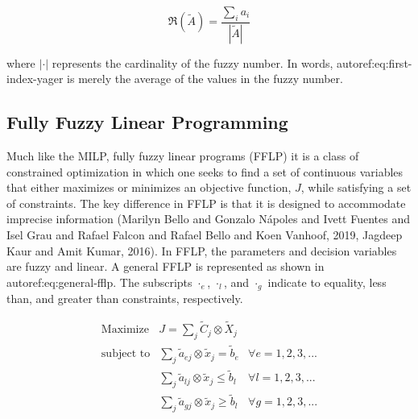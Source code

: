 \documentclass[11pt,a4paper,final]{article}
\begin{document}
\begin{equation}
\label{eq:first-index-yager}
\mathfrak{R}(\tilde{A}) = \frac{\sum_i a_i}{|\tilde{A}|}
\end{equation}

\noindent
where \(|\cdot|\) represents the cardinality of the fuzzy number. In words, autoref:eq:first-index-yager is merely the average
of the values in the fuzzy number.

\subsection{Fully Fuzzy Linear Programming}
\label{sec:org3530f70}
Much like the MILP, fully fuzzy linear programs (FFLP) it is a class of constrained optimization in which one seeks to
find a set of continuous variables that either maximizes or minimizes an objective function, \(J\), while satisfying a set
of constraints. The key difference in FFLP is that it is designed to accommodate imprecise information
(Marilyn Bello and Gonzalo N{\'a}poles and Ivett Fuentes and Isel Grau and Rafael Falcon and Rafael Bello and Koen Vanhoof, 2019, Jagdeep Kaur and Amit Kumar, 2016). In FFLP, the parameters and decision variables are fuzzy and
linear. A general FFLP is represented as shown in autoref:eq:general-fflp. The subscripts \(\cdot_e\), \(\cdot_l\), and \(\cdot_g\)
indicate to equality, less than, and greater than constraints, respectively.

\begin{equation}
\label{eq:general-fflp}
\begin{array}{lll}
\text{Maximize}   & J = \sum_j \tilde{C}_j \otimes \tilde{X}_j              &                 \\
\text{subject to} & \sum_j \tilde{a}_{ej} \otimes \tilde{x}_j = \tilde{b}_e &  \forall e = 1,2,3,... \\
                  & \sum_j \tilde{a}_{lj} \otimes \tilde{x}_j \le \tilde{b}_l &  \forall l = 1,2,3,... \\
                  & \sum_j \tilde{a}_{gj} \otimes \tilde{x}_j \ge \tilde{b}_l &  \forall g = 1,2,3,...
\end{array}
\end{equation}
\end{document}
